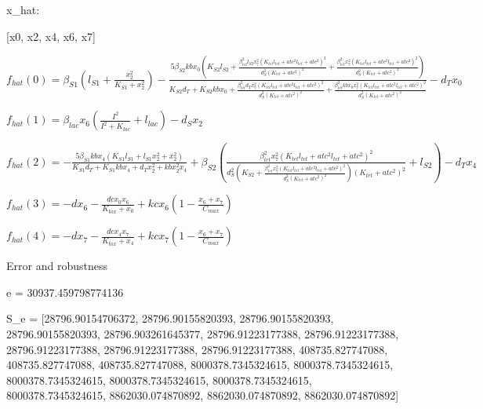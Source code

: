 x_{hat}: 

[x0, x2, x4, x6, x7]


$f_{hat}(0)=\beta_{S1} \left(l_{S1} + \frac{x_{2}^{2}}{K_{S1} + x_{2}^{2}}\right) - \frac{5 \beta_{S2} kb x_{0} \left(K_{S2} l_{S2} + \frac{\beta_{tet}^{2} l_{S2} x_{7}^{2} \left(K_{tet} l_{tet} + atc^{2} l_{tet} + atc^{2}\right)^{2}}{d_{S}^{2} \left(K_{tet} + atc^{2}\right)^{2}} + \frac{\beta_{tet}^{2} x_{7}^{2} \left(K_{tet} l_{tet} + atc^{2} l_{tet} + atc^{2}\right)^{2}}{d_{S}^{2} \left(K_{tet} + atc^{2}\right)^{2}}\right)}{K_{S2} d_{T} + K_{S2} kb x_{0} + \frac{\beta_{tet}^{2} d_{T} x_{7}^{2} \left(K_{tet} l_{tet} + atc^{2} l_{tet} + atc^{2}\right)^{2}}{d_{S}^{2} \left(K_{tet} + atc^{2}\right)^{2}} + \frac{\beta_{tet}^{2} kb x_{0} x_{7}^{2} \left(K_{tet} l_{tet} + atc^{2} l_{tet} + atc^{2}\right)^{2}}{d_{S}^{2} \left(K_{tet} + atc^{2}\right)^{2}}} - d_{T} x_{0}$


$f_{hat}(1)=\beta_{lac} x_{6} \left(\frac{I^{2}}{I^{2} + K_{lac}} + l_{lac}\right) - d_{S} x_{2}$


$f_{hat}(2)=- \frac{5 \beta_{S1} kb x_{4} \left(K_{S1} l_{S1} + l_{S1} x_{2}^{2} + x_{2}^{2}\right)}{K_{S1} d_{T} + K_{S1} kb x_{4} + d_{T} x_{2}^{2} + kb x_{2}^{2} x_{4}} + \beta_{S2} \left(\frac{\beta_{tet}^{2} x_{7}^{2} \left(K_{tet} l_{tet} + atc^{2} l_{tet} + atc^{2}\right)^{2}}{d_{S}^{2} \left(K_{S2} + \frac{\beta_{tet}^{2} x_{7}^{2} \left(K_{tet} l_{tet} + atc^{2} l_{tet} + atc^{2}\right)^{2}}{d_{S}^{2} \left(K_{tet} + atc^{2}\right)^{2}}\right) \left(K_{tet} + atc^{2}\right)^{2}} + l_{S2}\right) - d_{T} x_{4}$


$f_{hat}(3)=- d x_{6} - \frac{dc x_{0} x_{6}}{K_{tox} + x_{0}} + kc x_{6} \left(1 - \frac{x_{6} + x_{7}}{C_{max}}\right)$


$f_{hat}(4)=- d x_{7} - \frac{dc x_{4} x_{7}}{K_{tox} + x_{4}} + kc x_{7} \left(1 - \frac{x_{6} + x_{7}}{C_{max}}\right)$



Error and robustness 


e = 30937.459798774136

S_e = [28796.90154706372, 28796.90155820393, 28796.90155820393, 28796.90155820393, 28796.903261645377, 28796.91223177388, 28796.91223177388, 28796.91223177388, 28796.91223177388, 28796.91223177388, 408735.827747088, 408735.827747088, 408735.827747088, 8000378.7345324615, 8000378.7345324615, 8000378.7345324615, 8000378.7345324615, 8000378.7345324615, 8000378.7345324615, 8862030.074870892, 8862030.074870892, 8862030.074870892]

